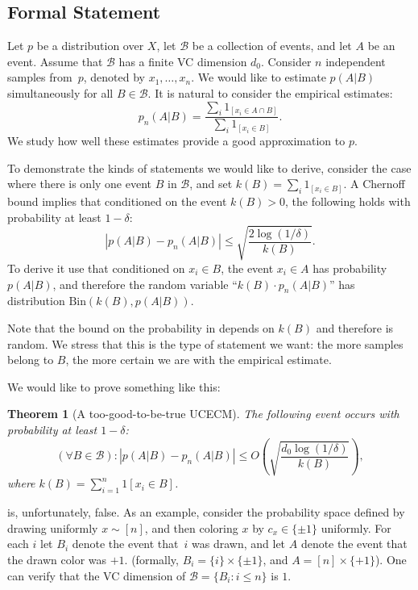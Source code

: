 \documentclass{article}
\def\B{{\mathcal B}}
\newcommand{\cB}{\mathcal{B}}
\newtheorem{theorem}{Theorem}
\begin{document}
\subsection{Formal Statement}

Let $p$ be a distribution over $X$, let $\cB$ be a collection of events, and let $A$ be an event.
Assume that $\cB$ has a finite VC dimension $d_0$.
Consider $n$ independent samples from~$p$, denoted by $x_1,\ldots,x_n$.
We would like to estimate $p(A \vert B)$ simultaneously for all $B\in \B$.
It is natural to consider the empirical estimates:
\[p_n(A\vert B)=\frac{\sum_i 1_{[x_i\in A \cap B]}}{\sum_i 1_{[x_i\in B]}}.\]
We study how well these estimates provide a good approximation to $p$.

To demonstrate the kinds of statements we would like to derive,
consider the case where there is only one event $B$ in $\cB$, 
and set $k(B)=\sum_i 1_{[x_i\in B]}$.
A Chernoff bound implies that conditioned on the event $k(B)>0$, 
the following holds with probability at least $1-\delta$:
\begin{equation}\label{eq:chernoff}
\left\lvert p(A\vert B) - p_n(A \vert B) \right\rvert \leq \sqrt{\frac{2\log(1/\delta)}{k(B)}}.
\end{equation}
To derive it use that conditioned on $x_i\in B$, the event $x_i\in A$ has probability $p(A\vert B)$, 
and therefore the random variable ``$k(B)\cdot p_n(A \vert B)$'' has distribution $\mbox{Bin}(k(B), p(A\vert B))$.

Note that the bound on the probability in  depends on $k(B)$
and therefore is random.
We stress that this is the type of statement we want:
the more samples belong to $B$, the more certain we are with the empirical estimate.

We would like to prove something like this:
\begin{theorem}[A too-good-to-be-true UCECM]\label{thm:toogood}
The following event occurs with probability at least $1-\delta$:
\[\left(\forall B\in\B\right):\left\lvert p(A \vert B) - p_n(A \vert B) \right\rvert \leq O\left(\sqrt{\frac{d_0 \log(1/\delta)}{k(B)}}\right),\]
where $k(B) = \sum_{i=1}^n 1[x_i\in B]$.
\end{theorem}
 is, unfortunately, false. 
As an example, consider the probability space defined by drawing uniformly $x\sim[n]$,
and then coloring $x$ by $c_x\in\{\pm 1\}$ uniformly.
For each $i$ let $B_i$ denote the event that~$i$ was drawn,
and let $A$ denote the event that the drawn color was  $+1$.
(formally, $B_i = \{i\}\times\{\pm 1\}$, and $A=[n]\times\{+1\}$).
One can verify that the VC dimension of $\B=\{B_i : i\leq n\}$ is $1$.
\end{document}
